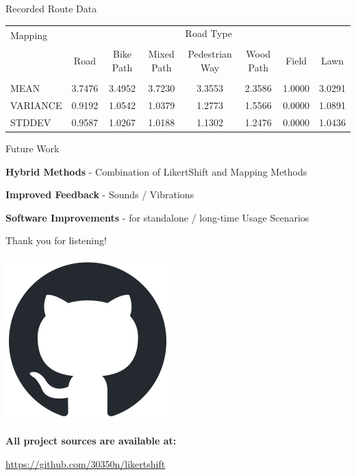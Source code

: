 \documentclass[
    english,
    accentcolor=9c,
    design=2023,
    logofile=images/hulogo.pdf,
]{tudabeamer}
\begin{document}
{\begin{frame}{Recorded Route Data}
\begin{table}[!htb]
            \vspace{1em}
            \begin{tabular}{l|ccccccc}
                \multirow{2}{*}{Mapping} & \multicolumn{7}{c}{Road Type}\\
                \cline{2-8}
                &&&&&&&\\[-1em]
                & Road & Bike Path & Mixed Path & Pedestrian Way & Wood Path & Field & Lawn\\[0.15em]
                \hline
                &&&&&&&\\[-0.8em]
                MEAN     & 3.7476 & 3.4952 & 3.7230 & 3.3553 & 2.3586 & 1.0000 & 3.0291\\[0.3em]
                VARIANCE & 0.9192 & 1.0542 & 1.0379 & 1.2773 & 1.5566 & 0.0000 & 1.0891\\[0.3em]
                STDDEV   & 0.9587 & 1.0267 & 1.0188 & 1.1302 & 1.2476 & 0.0000 & 1.0436\\
            \end{tabular}
        \end{table}
    \end{frame}
}

\begin{frame}{Future Work}
    \large

    \vspace*{2em}
    \textbf{Hybrid Methods} - Combination of LikertShift and Mapping Methods
    \pause

    \vspace*{2em}
    \textbf{Improved Feedback} - Sounds / Vibrations
    \pause

    \vspace*{2em}
    \textbf{Software Improvements} - for standalone / long-time Usage Scenarios
\end{frame}

\begin{frame}{Thank you for listening!}
    \large
    \centering

    \vspace*{2.5em}
    \includegraphics[height=0.175\linewidth]{images/github-mark.png}

    \vspace*{1em}
    \textbf{All project sources are available at:}

    \vspace*{0.5em}
    \url{https://github.com/30350n/likertshift}

\end{frame}
\end{document}

